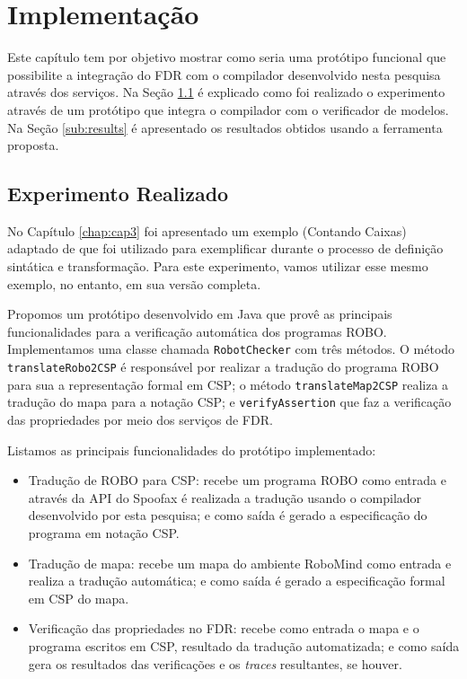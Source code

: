 \chapter{Implementação} %
\label{chap:cap4}
Este capítulo tem por objetivo mostrar como seria uma protótipo funcional que possibilite a integração do FDR com o compilador desenvolvido nesta pesquisa através dos serviços. Na Seção \ref{sub:exper} é explicado como foi realizado o experimento através de um protótipo que integra o compilador com o verificador de modelos. Na Seção \ref{sub:results} é apresentado os resultados obtidos usando a ferramenta proposta.

\section{Experimento Realizado}
\label{sub:exper}

No Capítulo \ref{chap:cap3} foi apresentado um exemplo (Contando Caixas) adaptado de \cite{furb} que foi utilizado para exemplificar durante o processo de definição sintática e transformação. Para este experimento, vamos utilizar esse mesmo exemplo, no entanto, em sua versão completa.

Propomos um protótipo desenvolvido em Java que provê as principais funcionalidades para a verificação automática dos programas ROBO. Implementamos uma classe chamada \texttt{RobotChecker} com três métodos. O método \texttt{translateRobo2CSP} é responsável por realizar a tradução do programa ROBO para sua a representação formal em CSP; o método \texttt{translateMap2CSP} realiza a tradução do mapa para a notação CSP; e \texttt{verifyAssertion} que faz a verificação das propriedades por meio dos serviços de FDR.

Listamos as principais funcionalidades do protótipo implementado:

\begin{itemize}
    \item Tradução de ROBO para CSP: recebe um programa ROBO como entrada e através da API do Spoofax é realizada a tradução usando o compilador desenvolvido por esta pesquisa; e como saída é gerado a especificação do programa em notação CSP.
    \item Tradução de mapa: recebe um mapa do ambiente RoboMind como entrada e realiza a tradução automática; e como saída é gerado a especificação formal em CSP do mapa.
    \item Verificação das propriedades no FDR: recebe como entrada o mapa e o programa escritos em CSP, resultado da tradução automatizada; e como saída gera os resultados das verificações e os \textit{traces} resultantes, se houver.
\end{itemize}

